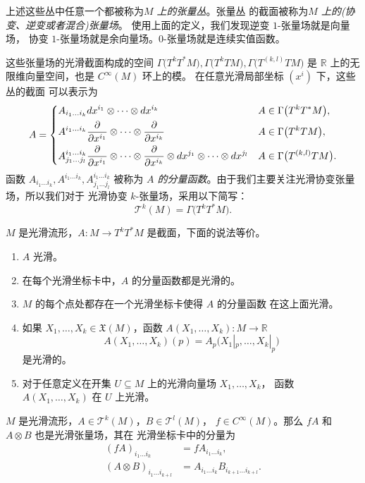 上述这些丛中任意一个都被称为\emph{$M$ 上的张量丛}。张量丛
的截面被称为\emph{$M$ 上的(协变、逆变或者混合)张量场}。
使用上面的定义，我们发现逆变 $1$-张量场就是向量场，
协变 $1$-张量场就是余向量场。$0$-张量场就是连续实值函数。

这些张量场的光滑截面构成的空间 
$\Gamma\bigl(T^kT^*M\bigr),\Gamma\bigl(T^kTM\bigr),\Gamma\bigl(T^{(k,l)}TM\bigr)$
是 $\mathbb{R}$ 上的无限维向量空间，也是 $C^\infty(M)$ 环上的模。
在任意光滑局部坐标 $\left(x^i\right)$ 下，这些丛的截面
可以表示为
\[
  A=\begin{dcases}
    A_{i_1\dots i_k}dx^{i_1}\otimes\cdots\otimes dx^{i_k} & A\in \Gamma\bigl(T^kT^*M\bigr),\\
    A^{i_1\dots i_k}\frac{\partial}{\partial x^{i_1}}\otimes
    \cdots\otimes \frac{\partial}{\partial x^{i_k}} & A\in \Gamma\bigl(T^kTM\bigr),\\
    A_{j_1\dots j_l}^{i_1\dots i_k}\frac{\partial}{\partial x^{i_1}}\otimes
    \cdots\otimes \frac{\partial}{\partial x^{i_k}}\otimes
    dx^{j_1}\otimes\cdots\otimes dx^{j_l} & A\in \Gamma\bigl(T^{(k,l)}TM\bigr).
  \end{dcases}  
\]
函数 $A_{i_1\dots i_k},A^{i_1\dots i_k},A_{j_1\dots j_l}^{i_1\dots i_k}$ 被称为
\emph{$A$ 的分量函数}。由于我们主要关注光滑协变张量场，所以我们对于
光滑协变 $k$-张量场，采用以下简写：
\[
  \mathcal{T}^k(M)=\Gamma\bigl(T^kT^*M\bigr)  .
\]

\begin{proposition}[张量场的光滑性判别]
  $M$ 是光滑流形，$A:M\to T^kT^*M$ 是截面，下面的说法等价。
  \begin{enumerate}
    \item $A$ 光滑。
    \item 在每个光滑坐标卡中，$A$ 的分量函数都是光滑的。
    \item $M$ 的每个点处都存在一个光滑坐标卡使得 $A$ 的分量函数
    在这上面光滑。
    \item 如果 $X_1,\dots,X_k\in \mathfrak{X}(M)$，函数 $A(X_1,\dots,X_k):M\to \mathbb{R}$
    \[
      A(X_1,\dots,X_k)(p)=A_p\bigl(X_1|_p,\dots,X_k|_p\bigr)
    \]
    是光滑的。
    \item 对于任意定义在开集 $U\subseteq M$ 上的光滑向量场 $X_1,\dots,X_k$，
    函数 $A(X_1,\dots,X_k)$ 在 $U$ 上光滑。
  \end{enumerate}
\end{proposition}

\begin{proposition}
  $M$ 是光滑流形，$A\in \mathcal{T}^k(M)$，$B\in \mathcal{T}^l(M)$，
  $f\in C^\infty(M)$。那么 $fA$ 和 $A\otimes B$ 也是光滑张量场，其在
  光滑坐标卡中的分量为
  \begin{align*}
    (fA)_{i_1\dots i_k}&= fA_{i_1\dots i_k},\\
    (A\otimes B)_{i_1\dots i_{k+l}}&=A_{i_1\dots i_k}B_{i_{k+1}\dots i_{k+l}}.
  \end{align*}
\end{proposition}

